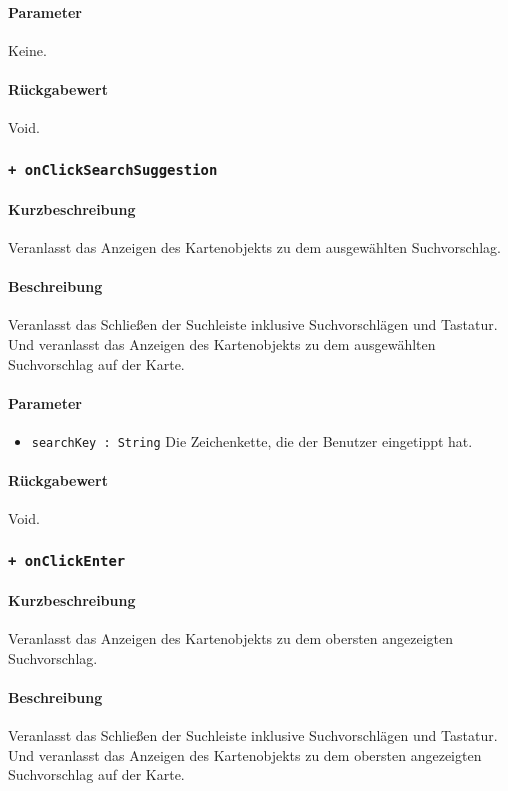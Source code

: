 \paragraph*{Parameter}
Keine.
\paragraph*{Rückgabewert}
Void.

\subsubsection*{\texttt{+ onClickSearchSuggestion}}%
\paragraph*{Kurzbeschreibung}
Veranlasst das Anzeigen des Kartenobjekts zu dem ausgewählten Suchvorschlag.
\paragraph*{Beschreibung}
Veranlasst das Schließen der Suchleiste inklusive Suchvorschlägen und Tastatur.
Und veranlasst das Anzeigen des Kartenobjekts zu dem ausgewählten Suchvorschlag auf der Karte.
\paragraph*{Parameter}
\begin{itemize}
    \item \texttt{searchKey : String} Die Zeichenkette, die der Benutzer eingetippt hat.
\end{itemize}
\paragraph*{Rückgabewert}
Void.

\subsubsection*{\texttt{+ onClickEnter}}%
\paragraph*{Kurzbeschreibung}
Veranlasst das Anzeigen des Kartenobjekts zu dem obersten angezeigten Suchvorschlag.
\paragraph*{Beschreibung}
Veranlasst das Schließen der Suchleiste inklusive Suchvorschlägen und Tastatur.
Und veranlasst das Anzeigen des Kartenobjekts zu dem obersten angezeigten Suchvorschlag auf der Karte.
